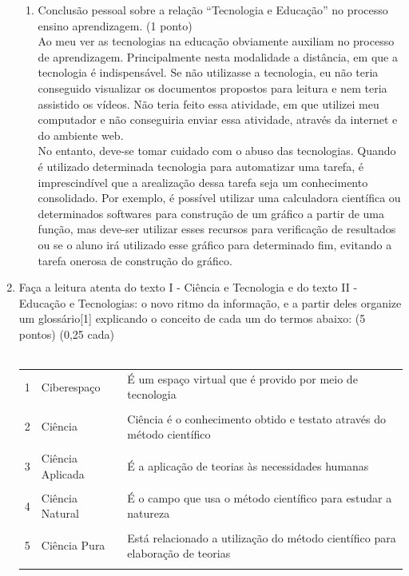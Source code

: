\documentclass[a4paper, 12pt]{article}
\begin{document}
\begin{enumerate}
\begin{enumerate}
  \item Conclusão pessoal sobre a relação “Tecnologia e Educação” no processo ensino aprendizagem. (1 ponto) \\
    Ao meu ver as tecnologias na educação obviamente auxiliam no processo de aprendizagem. Principalmente nesta modalidade a distância, em que a tecnologia é indispensável. Se não utilizasse a tecnologia, eu não teria conseguido visualizar os documentos propostos para leitura e nem teria assistido os vídeos. Não teria feito essa atividade, em que utilizei meu computador e não conseguiria enviar essa atividade, através da internet e do ambiente web. \\
    No entanto, deve-se tomar cuidado com o abuso das tecnologias. Quando é utilizado determinada tecnologia para automatizar uma tarefa, é imprescindível que a arealização dessa tarefa seja um conhecimento consolidado. Por exemplo, é possível utilizar uma calculadora científica ou determinados softwares para construção de um gráfico a partir de uma função, mas deve-ser utilizar esses recursos para verificação de resultados ou se o aluno irá utilizado esse gráfico para determinado fim, evitando a tarefa onerosa de construção do gráfico.
  \end{enumerate}
  \item Faça a leitura atenta do texto I  - Ciência e  Tecnologia e   do texto II -  Educação e Tecnologias: o novo ritmo da informação,   e a partir deles organize um glossário[1] explicando o conceito de cada um do termos abaixo: (5 pontos) (0,25 cada) \\ \\
    \begin{tabular}{|m{0.5cm}|m{5cm}|m{8cm}|}
      \hline
      1 & Ciberespaço & É um espaço virtual que é provido por meio de tecnologia  \\ \\
      \hline
      2 & Ciência & Ciência é o conhecimento obtido e testato através do método científico \\ \\
      \hline
      3 & Ciência Aplicada & É a aplicação de teorias às necessidades humanas \\ \\
      \hline
      4 & Ciência Natural & É o campo que usa o método científico para estudar a natureza \\ \\
      \hline
      5 & Ciência Pura & Está relacionado a utilização do método científico para elaboração de teorias \\ \\

\end{tabular}
\end{enumerate}
\end{document}
